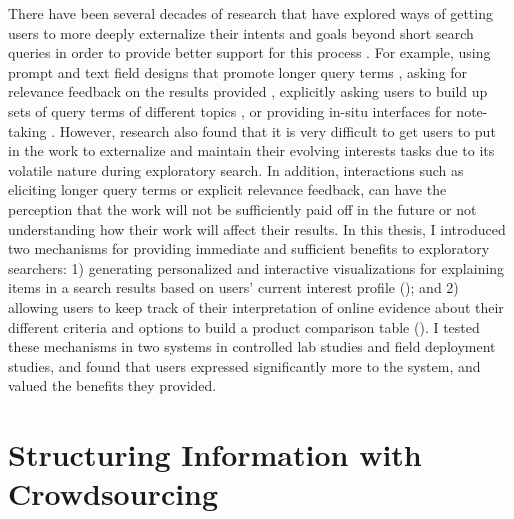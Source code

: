 There have been several decades of research that have explored ways of getting users to more deeply externalize their intents and goals beyond short search queries in order to provide better support for this process \cite{jansen2000real}. For example, using prompt and text field designs that promote longer query terms \cite{franzen2000verbosity,belkin2003query}, asking for relevance feedback on the results provided \cite{salton1990improving,rui1998relevance,peltonen2017negative}, explicitly asking users to build up sets of query terms of different topics \cite{hearst1996visualizing,hoeber2006comparative}, or providing in-situ interfaces for note-taking \cite{notetoself}. However, research also found that it is very difficult to get users to put in the work to externalize and maintain their evolving interests tasks due to its volatile nature during exploratory search. In addition, interactions such as eliciting longer query terms or explicit relevance feedback, can have the perception that the work will not be sufficiently paid off in the future or not understanding how their work will affect their results. In this thesis, I introduced two mechanisms for providing immediate and sufficient benefits to exploratory searchers: 1) generating personalized and interactive visualizations for explaining items in a search results based on users’ current interest profile  (); and 2) allowing users to keep track of their interpretation of online evidence about their different criteria and options to build a product comparison table (). I tested these mechanisms in two systems in controlled lab studies and field deployment studies, and found that users expressed significantly more to the system, and valued the benefits they provided.


\section{Structuring Information with Crowdsourcing}

